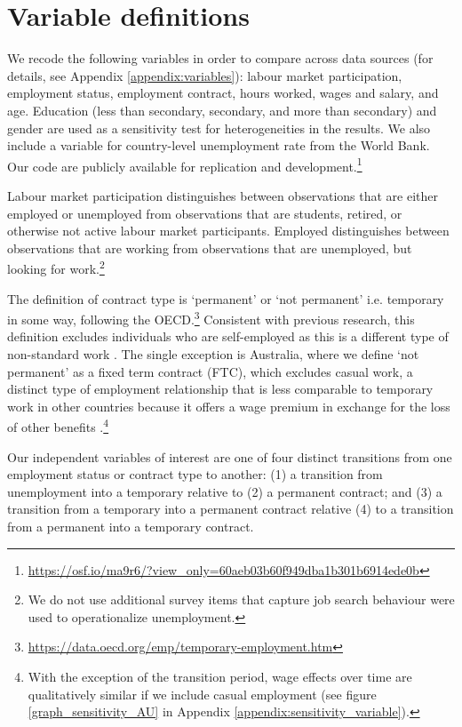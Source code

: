 \documentclass[12pt]{article}
\begin{document}
\section{Variable definitions}

We recode the following variables in order to compare across data sources (for details, see Appendix \ref{appendix:variables}): labour market participation, employment status, employment contract, hours worked, wages and salary, and age.  Education (less than secondary, secondary, and more than secondary) and gender are used as a sensitivity test for heterogeneities in the results.  We also include a variable for country-level unemployment rate from the World Bank.  Our code are publicly available for replication and development.\footnote{\url{https://osf.io/ma9r6/?view_only=60aeb03b60f949dba1b301b6914ede0b}} 

Labour market participation distinguishes between observations that are either employed or unemployed from observations that are students, retired, or otherwise not active labour market participants.  Employed distinguishes between observations that are working from observations that are unemployed, but looking for work.\footnote{We do not use additional survey items that capture job search behaviour were used to operationalize unemployment.}  

The definition of contract type is `permanent' or `not permanent' i.e. temporary in some way, following the OECD.\footnote{\url{https://data.oecd.org/emp/temporary-employment.htm}}  Consistent with previous research, this definition excludes individuals who are self-employed as this is a different type of non-standard work \citep{booth_temporary_2002,kalleberg_nonstandard_2000}.  The single exception is Australia, where we define `not permanent' as a fixed term contract (FTC), which excludes casual work, a distinct type of employment relationship that is less comparable to temporary work in other countries because it offers a wage premium in exchange for the loss of other benefits \citep{mooi-reci_casual_2017}.\footnote{With the exception of the transition period, wage effects over time are qualitatively similar if we include casual employment (see figure \ref{graph_sensitivity_AU} in Appendix \ref{appendix:sensitivity_variable}).} 

Our independent variables of interest are one of four distinct transitions from one employment status or contract type to another: (1) a transition from unemployment into a temporary relative to (2) a permanent contract; and (3) a transition from a temporary into a permanent contract relative (4) to a transition from a permanent into a temporary contract.  
\end{document}

